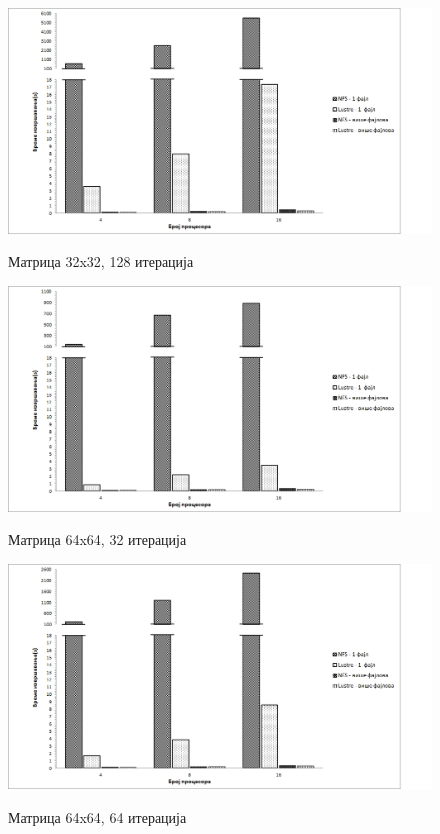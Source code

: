     \begin{figure}[H]
      \centering
          \includegraphics[width=1\textwidth]{slike/results/32_128.png}\\[1cm]
      \caption{Матрица 32x32, 128 итерација}
    \end{figure}
   
    \begin{figure}[H]
      \centering
          \includegraphics[width=1\textwidth]{slike/results/64_32.png}\\[1cm]
      \caption{Матрица 64x64, 32 итерација}
    \end{figure}
    
     \begin{figure}[H]
       \centering
           \includegraphics[width=1\textwidth]{slike/results/64_64.png}\\[1cm]
        \caption{Матрица 64x64, 64 итерација}
     \end{figure}
     

